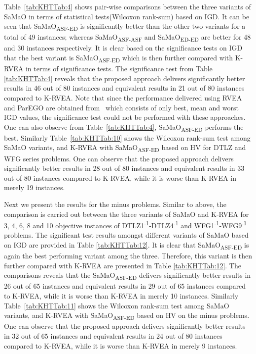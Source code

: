 \documentclass[twocolumn,10pt]{asme2ej}
\begin{document}
Table~\ref{tab:KHTTab:4} shows pair-wise comparisons between the three variants of SaMaO in terms of statistical tests(Wilcoxon rank-sum) based on IGD. It can be seen that SaMaO\textsubscript{ASF-ED} is significantly better than the other two variants for a total of 49 instances; whereas SaMaO\textsubscript{ASF-ASF} and SaMaO\textsubscript{ED-ED} are better for 48 and 30 instances respectively. It is clear based on the significance tests on IGD that the best variant is SaMaO\textsubscript{ASF-ED} which is then further compared with K-RVEA in terms of significance tests. The significance test from Table \ref{tab:KHTTab:4} reveals that the proposed approach delivers significantly better results in 46 out of 80 instances and equivalent results in 21 out of 80 instances compared to K-RVEA. Note that since the performance delivered using RVEA and ParEGO are obtained from~\cite{KHTchugh2016krvea} which consists of only best, mean and worst IGD values, the significance test could not be performed with these approaches. One can also observe from Table~\ref{tab:KHTTab:4}, SaMaO\textsubscript{ASF-ED} performs the best. Similarly Table~\ref{tab:KHTTab:10} shows the Wilcoxon rank-sum test among SaMaO variants, and K-RVEA with SaMaO\textsubscript{ASF-ED} based on HV for DTLZ and WFG series problems. One can observe that the proposed approach delivers significantly better results in 28 out of 80 instances and equivalent results in 33 out of 80 instances compared to K-RVEA, while it is worse than K-RVEA in merely 19 instances.


Next we present the results for the minus problems. Similar to above, the comparison is carried out between the three variants of SaMaO and K-RVEA for 3, 4, 6, 8 and 10 objective instances of DTLZ1\textsuperscript{-1}-DTLZ4\textsuperscript{-1} and WFG1\textsuperscript{-1}-WFG9\textsuperscript{-1} problems. The significant test results amongst different variants of SaMaO based on IGD are provided in Table \ref{tab:KHTTab:12}. It is clear that SaMaO\textsubscript{ASF-ED} is again the best performing variant among the three. Therefore, this variant is then further compared with K-RVEA are presented in Table \ref{tab:KHTTab:12}. The comparisons reveals that the SaMaO\textsubscript{ASF-ED} delivers significantly better results in 26 out of 65 instances and equivalent results in 29 out of 65 instances compared to K-RVEA, while it is worse than K-RVEA in merely 10 instances. Similarly Table~\ref{tab:KHTTab:11} shows the Wilcoxon rank-sum test among SaMaO variants, and K-RVEA with SaMaO\textsubscript{ASF-ED} based on HV on the minus problems. One can observe that the proposed approach delivers significantly better results in 32 out of 65 instances and equivalent results in 24 out of 80 instances compared to K-RVEA, while it is worse than K-RVEA in merely 9 instances.
\end{document}
